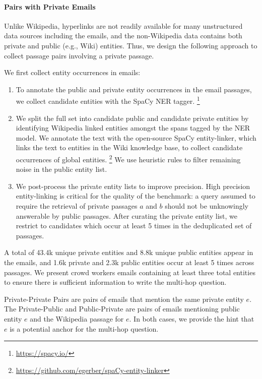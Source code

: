 \documentclass{article}
\begin{document}
\paragraph{Pairs with Private Emails} Unlike Wikipedia, hyperlinks are not readily available for many unstructured data sources including the emails, and the non-Wikipedia data contains both private and public (e.g., Wiki) entities. Thus, we design the following approach to collect passage pairs involving a private passage. 

We first collect entity occurrences in emails:
\begin{enumerate}
    \item To annotate the public and private entity occurrences in the email passages, we collect candidate entities with the SpaCy NER tagger. \footnote{\url{https://spacy.io/}}
    \item  We split the full set into candidate public and candidate private entities by identifying Wikipedia linked entities amongst the spans tagged by the NER model.  We annotate the text with the open-source SpaCy entity-linker, which links the text to entities in the Wiki knowledge base, to collect candidate occurrences of global entities.
    \footnote{\url{https://github.com/egerber/spaCy-entity-linker}} We use heuristic rules to filter remaining noise in the public entity list. 
    \item We post-process the private entity lists to improve precision.  High precision entity-linking is critical for the quality of the benchmark: a query assumed to require the retrieval of private passages $a$ and $b$ should not be unknowingly answerable by public passages. 
    After curating the private entity list, we restrict to candidates which occur at least 5 times in the deduplicated set of passages.
\end{enumerate}


A total of 43.4k unique private entities and 8.8k unique public entities appear in the emails, and 1.6k private and 2.3k public entities occur at least 5 times across passages. We present crowd workers emails containing at least three total entities to ensure there is sufficient information to write the multi-hop question.

Private-Private Pairs are pairs of emails that mention the same private entity $e$. The Private-Public and Public-Private are pairs of emails mentioning public entity $e$ and the Wikipedia passage for $e$. In both cases, we provide the hint that $e$ is a potential anchor for the multi-hop question. 
\end{document}
